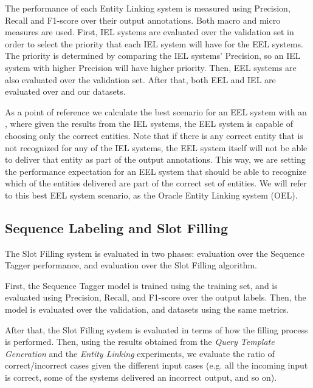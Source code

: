 The performance of each Entity Linking system is measured using Precision, Recall and F1-score 
over their output annotations. Both macro and micro measures are used. First, IEL systems are 
evaluated over the \LCQuADtwo{} validation set in order to select the priority that each IEL system 
will have for the EEL systems. The priority is determined by comparing the IEL systems’ Precision, 
so an IEL system with higher Precision will have higher priority. Then, EEL systems are also 
evaluated over the \LCQuADtwo{} validation set. After that, both EEL and IEL are evaluated over 
\QALDseven{} and our \WikiSPARQL{} datasets.

As a point of reference we calculate the best scenario for an EEL system with an , 
where given the results from the IEL systems, the EEL system is capable of choosing only the 
correct entities. Note that if there is any correct entity that is not recognized for any of the 
IEL systems, the EEL system itself will not be able to deliver that entity as part of the output 
annotations. This way, we are setting the performance expectation for an EEL system that should 
be able to recognize which of the entities delivered are part of the correct set of entities. We 
will refer to this best EEL system scenario, as the Oracle Entity Linking system (OEL).


\subsection{Sequence Labeling and Slot Filling}
\label{cap4:experimentalDesign/seqLabAndSlotFilling}
The Slot Filling system is evaluated in two phases: evaluation over the Sequence Tagger 
performance, and evaluation over the Slot Filling algorithm. 

First, the Sequence Tagger model is trained using the \LCQuADtwo{} training set, and is evaluated 
using Precision, Recall, and F1-score over the output labels. Then, the model is evaluated over 
the \LCQuADtwo{} validation, \QALDseven{} and \WikiSPARQL{} datasets using the same metrics.

After that, the Slot Filling system is evaluated in terms of how the filling process is performed. 
Then, using the results obtained from the \textit{Query Template Generation} and the 
\textit{Entity Linking} experiments, we evaluate the ratio of correct/incorrect cases given the 
different input cases (e.g. all the incoming input is correct, some of the systems delivered an 
incorrect output, and so on).

